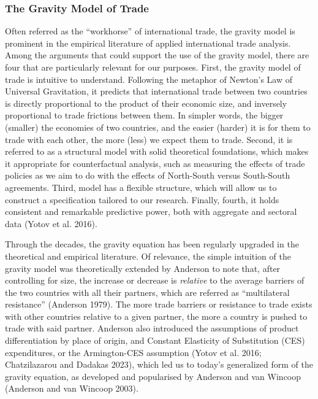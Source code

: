\documentclass[12pt]{article}%
\begin{document}
\subsubsection{The Gravity Model of Trade}%
\label{ssubsec:TheGravityModelofTrade}%

%
Often referred as the ``workhorse'' of international trade, the gravity
model is prominent in the empirical literature of applied international
trade analysis. Among the arguments that could support the use of the
gravity model, there are four that are particularly relevant for our
purposes. First, the gravity model of trade is intuitive to understand.
Following the metaphor of Newton's Law of Universal Gravitation, it
predicts that international trade between two countries is directly
proportional to the product of their economic size, and inversely
proportional to trade frictions between them. In simpler words, the
bigger (smaller) the economies of two countries, and the easier (harder)
it is for them to trade with each other, the more (less) we expect them
to trade. Second, it is referred to as a structural model with solid
theoretical foundations, which makes it appropriate for counterfactual
analysis, such as measuring the effects of trade policies as we aim to
do with the effects of North-South versus South-South agreements. Third,
model has a flexible structure, which will allow us to construct a
specification tailored to our research. Finally, fourth, it holds
consistent and remarkable predictive power, both with aggregate and
sectoral data (Yotov et al. 2016).

Through the decades, the gravity equation has been regularly upgraded in
the theoretical and empirical literature. Of relevance, the simple
intuition of the gravity model was theoretically extended by Anderson to
note that, after controlling for size, the increase or decrease is
\emph{relative} to the average barriers of the two countries with all
their partners, which are referred as ``multilateral resistance''
(Anderson 1979). The more trade barriers or resistance to trade exists
with other countries relative to a given partner, the more a country is
pushed to trade with said partner. Anderson also introduced the
assumptions of product differentiation by place of origin, and Constant
Elasticity of Substitution (CES) expenditures, or the Armington-CES
assumption (Yotov et al. 2016; Chatzilazarou and Dadakas 2023), which
led us to today's generalized form of the gravity equation, as developed
and popularised by Anderson and van Wincoop (Anderson and van Wincoop
2003).
\end{document}
